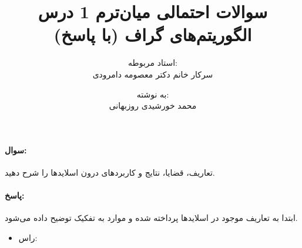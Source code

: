 \documentclass[a4paper,10pt]{article}
\title{سوالات احتمالی میان‌ترم 1 درس الگوریتم‌های گراف (با پاسخ)}
\author{استاد مربوطه:\\سرکار خانم دکتر معصومه دامرودی \and به نوشته:\\محمد خورشیدی روزبهانی}
\date{}
\begin{document}
    \maketitle

    \paragraph{سوال:} تعاریف، قضایا، نتایج و کاربردهای درون اسلایدها را شرح دهید.

    \paragraph{پاسخ:} ابتدا به تعاریف موجود در اسلایدها پرداخته شده و موارد به تفکیک توضیح داده می‌شود.

    \begin{itemize}
        
        \item راس: 

    \end{itemize}
\end{document}
